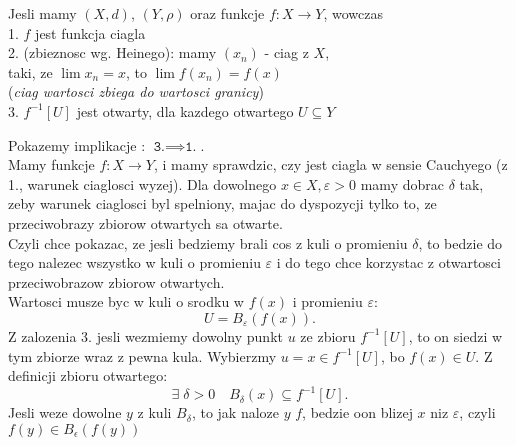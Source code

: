 \documentclass{article}
\begin{document}
    \begin{center}\large
        Jesli mamy $(X,d)$, $(Y,\rho)$ oraz funkcje $f:X\to Y$, wowczas\smallskip\\
        \color{def}1. \color{txt}$f$ jest funkcja ciagla\smallskip\\
        \color{def}2. \color{txt}(\color{acc}zbieznosc wg. Heinego\color{txt}): mamy $(x_n)$ - ciag z $X$, \\taki, ze $\lim x_n=x$, to $\lim f(x_n)=f(x)$ \\
        (\emph{ciag wartosci zbiega do wartosci granicy})\smallskip\\
        \color{def}3. \color{txt}$f^{-1}[U]$ jest otwarty, dla kazdego otwartego $U\subseteq Y$
    \end{center}\bigskip

    Pokazemy implikacje : $\texttt{3.}\implies\texttt{1.}$.\medskip\\
    Mamy funkcje $f:X\to Y$, i mamy sprawdzic, czy jest ciagla w sensie Cauchyego (z 1., warunek ciaglosci wyzej). Dla dowolnego $x\in X,\varepsilon>0$ mamy dobrac $\delta$ tak, zeby warunek ciaglosci byl spelniony, majac do dyspozycji tylko to, ze przeciwobrazy zbiorow otwartych sa otwarte.\smallskip\\
    Czyli chce pokazac, ze jesli bedziemy brali cos z kuli o promieniu $\delta$, to bedzie do tego nalezec wszystko w kuli o promieniu $\varepsilon$ i do tego chce korzystac z otwartosci przeciwobrazow zbiorow otwartych.\smallskip\\
    Wartosci musze byc w kuli o srodku w $f(x)$ i promieniu $\varepsilon$:
        $$U=B_\varepsilon(f(x)).$$
    Z zalozenia 3. jesli wezmiemy dowolny punkt $u$ ze zbioru $f^{-1}[U]$, to on siedzi w tym zbiorze wraz z pewna kula. Wybierzmy $u=x\in f^{-1}[U]$, bo $f(x)\in U$. Z definicji zbioru otwartego:
        $$\exists\;\delta>0\quad B_\delta{(x)}\subseteq f^{-1}[U].$$
    Jesli weze dowolne $y$ z kuli $B_\delta$, to jak naloze $y$ $f$, bedzie oon blizej $x$ niz $\varepsilon$, czyli $f(y)\in B_\epsilon(f(y))$
\end{document}
